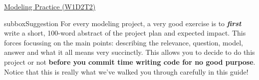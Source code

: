 \begin{textbox}{\href{https://compneuro.neuromatch.io/tutorials/W1D2_ModelingPractice/W1D2_Intro.html}{Modeling Practice  (W1D2T2)} }
\begin{subbox}{subbox}{Suggestion}
For every modeling project, a very good exercise is to \textit{\textbf{first}} write a short, 100-word abstract of the project plan and expected impact. This forces focussing on the main points: describing the relevance, question, model, answer and what it all means very succinctly. This allows you to decide to do this project or not \textbf{before you commit time writing code for no good purpose}. Notice that this is really what we've walked you through carefully in this guide! 

\end{subbox}
 
 
\end{textbox}
